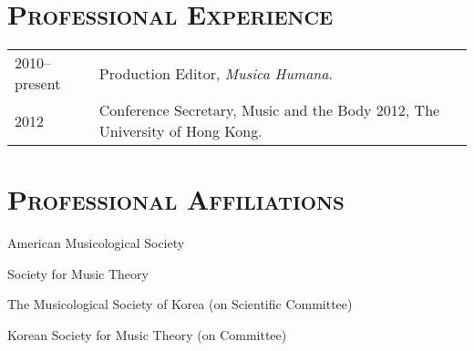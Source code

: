 \documentclass[a4paper,11pt]{article}
\begin{document}
  \vspace{2.5mm}
  
  \section*{\textsc{Professional Experience}}
  
  \hspace*{-0.25cm}
  \begin{tabular}{p{2.5cm} l}
    2010--present & Production Editor, \textit{Musica Humana}.\\
    2012 & Conference Secretary, Music and the Body 2012, The University of Hong Kong.
  \end{tabular}
  
  \vspace{2.5mm}
  
%  
%  
  \section*{\textsc{Professional Affiliations}}
  
  American Musicological Society
  
  \noindent Society for Music Theory
  
  \noindent The Musicological Society of Korea (on Scientific Committee)
  
  \noindent Korean Society for Music Theory (on Committee)
  
  
  
\end{document}
